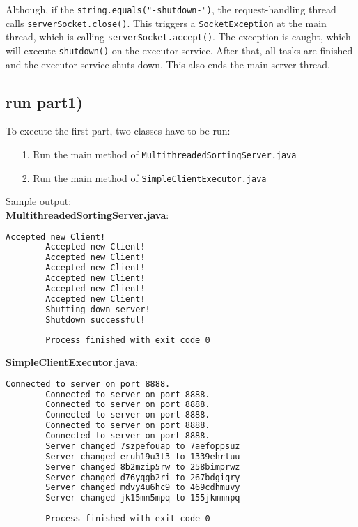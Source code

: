 \documentclass{article}
\begin{document}
    Although, if the \texttt{string.equals("-shutdown-")}, the request-handling thread calls \texttt{serverSocket.close()}. This triggers a \texttt{SocketException} at the main thread, which is calling \texttt{serverSocket.accept()}. The exception is caught, which will execute \texttt{shutdown()} on the executor-service. After that, all tasks are finished and the executor-service shuts down. This also ends the main server thread.\\
    
    \subsection*{run part1)}
    
      To execute the first part, two classes have to be run:
      \begin{itemize}
    	\item[1.] Run the main method of \texttt{MultithreadedSortingServer.java}
    	\item[2.] Run the main method of \texttt{SimpleClientExecutor.java}
      \end{itemize}
      Sample output:\\
      \textbf{MultithreadedSortingServer.java}:\\
      \begin{lstlisting}[language=sh]
        Accepted new Client!
        Accepted new Client!
        Accepted new Client!
        Accepted new Client!
        Accepted new Client!
        Accepted new Client!
        Accepted new Client!
        Shutting down server!
        Shutdown successful!
      
        Process finished with exit code 0
      \end{lstlisting}
      \textbf{SimpleClientExecutor.java}:\\
      \begin{lstlisting}[language=sh]
        Connected to server on port 8888.
        Connected to server on port 8888.
        Connected to server on port 8888.
        Connected to server on port 8888.
        Connected to server on port 8888.
        Connected to server on port 8888.
        Server changed 7szpefouap to 7aefoppsuz
        Server changed eruh19u3t3 to 1339ehrtuu
        Server changed 8b2mzip5rw to 258bimprwz
        Server changed d76yqgb2ri to 267bdgiqry
        Server changed mdvy4u6hc9 to 469cdhmuvy
        Server changed jk15mn5mpq to 155jkmmnpq
      
        Process finished with exit code 0
      \end{lstlisting}     
      
\end{document}
